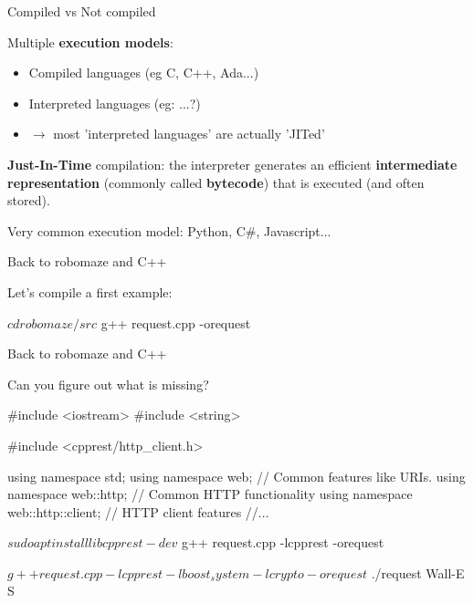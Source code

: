 \documentclass[compress]{beamer}
\begin{document}
\begin{frame}{Compiled vs Not compiled}

    Multiple \textbf{execution models}:

    \begin{itemize}
        \item<1-> Compiled languages (eg C, C++, Ada...)
        \item<2-> Interpreted languages (eg: ...?)
        \item<3-> $\rightarrow$ most 'interpreted languages' are actually 'JITed'
    \end{itemize}

     {

    \textbf{Just-In-Time} compilation: the interpreter generates an efficient
    \textbf{intermediate representation} (commonly called \textbf{bytecode})
    that is executed (and often stored).

    Very common execution model: Python, C\#, Javascript...

    }
\end{frame}

\begin{frame}[fragile]{Back to robomaze and C++}

Let's compile a first example:

 \begin{shcode}
$ cd robomaze/src
$ g++ request.cpp -orequest
\end{shcode}

\end{frame}


\begin{frame}[fragile]{Back to robomaze and C++}

Can you figure out what is missing?

\pause

\begin{cppcode}
#include <iostream>
#include <string>

#include <cpprest/http_client.h>

using namespace std;
using namespace web;                        // Common features like URIs.
using namespace web::http;                  // Common HTTP functionality
using namespace web::http::client;          // HTTP client features
//...
\end{cppcode}

\pause

\begin{shcode}
$ sudo apt install libcpprest-dev
$ g++ request.cpp -lcpprest -orequest
\end{shcode}

\pause

\begin{shcode}
$ g++ request.cpp -lcpprest -lboost_system -lcrypto  -orequest
$ ./request Wall-E S
\end{shcode}


\end{frame}
\end{document}
